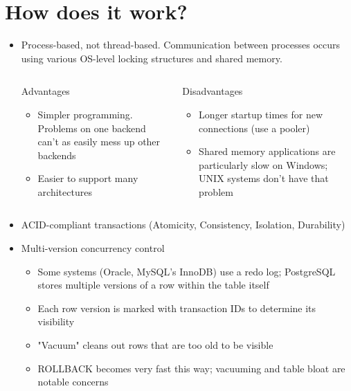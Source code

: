 \documentclass[svgnames]{beamer}
\begin{document}
\section{How does it work?}
\begin{frame}
    \begin{itemize}
        \item Process-based, not thread-based. Communication between processes occurs using various OS-level locking structures and shared memory.
        \begin{columns}[t]
            \begin{column}{0.45\textwidth}
                Advantages
                \begin{itemize}
                    \item Simpler programming. Problems on one backend can't as easily mess up other backends
                    \item Easier to support many architectures
                \end{itemize}
            \end{column}
            \begin{column}{0.45\textwidth}
                Disadvantages
                \begin{itemize}
                    \item Longer startup times for new connections (use a pooler)
                    \item Shared memory applications are particularly slow on Windows; UNIX systems don't have that problem
                \end{itemize}
            \end{column}
        \end{columns}
    \end{itemize}
\end{frame}

\begin{frame}
    \begin{itemize}
        \item ACID-compliant transactions (Atomicity, Consistency, Isolation, Durability)
        \item Multi-version concurrency control
        \begin{itemize}
            \item Some systems (Oracle, MySQL's InnoDB) use a redo log; PostgreSQL stores multiple versions of a row within the table itself
            \item Each row version is marked with transaction IDs to determine its visibility
            \item "Vacuum" cleans out rows that are too old to be visible
            \item ROLLBACK becomes very fast this way; vacuuming and table bloat are notable concerns
        \end{itemize}
    \end{itemize}
\end{frame}
\end{document}
